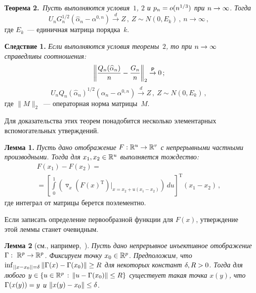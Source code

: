 \begin{multicols}{2}
\medskip

\noindent
\textbf{Теорема 2.}\
\textit{Пусть выполняются условия~$1$, $2$ и $p_{n}\hm=o(n^{1/3})$ при 
$n\hm\rightarrow\infty$. Тогда}
\begin{equation*}
U_{n}G^{1/2}_{n}\left(\widehat{\alpha}_{n}-\alpha^{0,n}\right)\stackrel{d}{\rightarrow}Z\,,\ 
Z\sim N(0, E_k)\,,\ n\rightarrow\infty\,,
\end{equation*}
где $E_k$~--- единичная матрица порядка~$k$.

\medskip

\noindent
\textbf{Следствие 1.}
\textit{Если выполняются условия теоремы~$2$, то при $n\hm\rightarrow\infty$ 
справедливы соотношения:}
\begin{equation*}
\left\|\displaystyle\frac{\displaystyle Q_n(\widehat{\alpha}_n)\mathstrut}{\displaystyle n\mathstrut}-\displaystyle\frac{\displaystyle G_n\mathstrut}{\displaystyle n\mathstrut}\right\|_2\stackrel{{\sf P}}{\rightarrow}0\,;
\end{equation*}
\begin{equation*}
U_nQ_n(\widehat{\alpha}_n)^{1/2}(\widehat{\alpha}_n-\alpha^{0,n})\stackrel{d}{\rightarrow}Z\,,\ 
Z\sim N(0, E_k)\,,\label{equation3}
\end{equation*}
где $\|M\|_2$~--- операторная норма матрицы~$M$.


\medskip

Для доказательства этих теорем понадобится несколько элементарных вспомогательных утверждений.

\medskip

\noindent
\textbf{Лемма 1.}
\textit{Пусть дано отображение $F:\R^u\hm\rightarrow\R^v$ с непрерывными частными производными. 
Тогда для $x_1,x_2\hm\in\R^u$ выполняется тождество:}
\begin{multline*}
F(x_1)-F(x_2)={}\\
{}=\left[\int\limits_{0}^{1}\left(\triangledown_{x} 
(F(x)^{\mathrm{T}})|_{x=x_2+u(x_1-x_2)}\right)
\,{du}\right]^{\mathrm{T}}(x_1-x_2)\,,
\end{multline*}
где интеграл от матрицы берется поэлементно.


\medskip

Если записать определение первообразной функции для $F(x)$, утверждение этой леммы станет очевидным.\\

\medskip

\noindent
\textbf{Лемма 2} (см., например,~\cite{rudin}).
\textit{Пусть дано непрерывное инъективное отображение $\Gamma:\ \R^p\hm\rightarrow \R^p$. 
Фиксируем точку $x_0\hm\in\R^p$. Предположим, что $\inf_{||x-x_0||\hm=\delta}\left\|\Gamma(x)\hm-
\Gamma(x_0)\right\|\hm\geq R$ для некоторых констант $\delta,R\hm>0$. Тогда для любого 
$y\hm\in\{u\in\R^p\,:\,\|u-\Gamma(x_0)\|\hm\leq R\}$ существует такая точка $x(y)$, 
что $\Gamma(x(y))\hm=y$ и $\|x(y)-x_0\|\hm\leq\delta$}.


\end{multicols}
